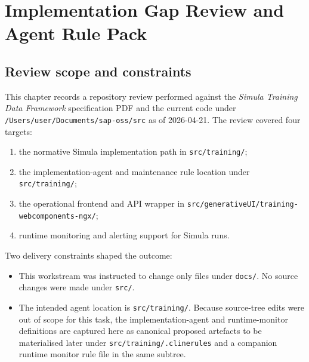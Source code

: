 \chapter{Implementation Gap Review and Agent Rule Pack}
\label{chap:simula-gap-review}

\section{Review scope and constraints}
This chapter records a repository review performed against the
\emph{Simula Training Data Framework} specification PDF and the
current code under \texttt{/Users/user/Documents/sap-oss/src} as of
2026-04-21. The review covered four targets:
\begin{enumerate}[label=\arabic*.]
  \item the normative Simula implementation path in
    \texttt{src/training/};
  \item the implementation-agent and maintenance rule location under
    \texttt{src/training/};
  \item the operational frontend and API wrapper in
    \texttt{src/generativeUI/training-webcomponents-ngx/};
  \item runtime monitoring and alerting support for Simula runs.
\end{enumerate}

Two delivery constraints shaped the outcome:
\begin{itemize}
  \item This workstream was instructed to change only files under
    \texttt{docs/}. No source changes were made under
    \texttt{src/}.
  \item The intended agent location is \texttt{src/training/}. Because
    source-tree edits were out of scope for this task, the
    implementation-agent and runtime-monitor definitions are captured
    here as canonical proposed artefacts to be materialised later
    under \texttt{src/training/.clinerules} and a companion runtime
    monitor rule file in the same subtree.
\end{itemize}


